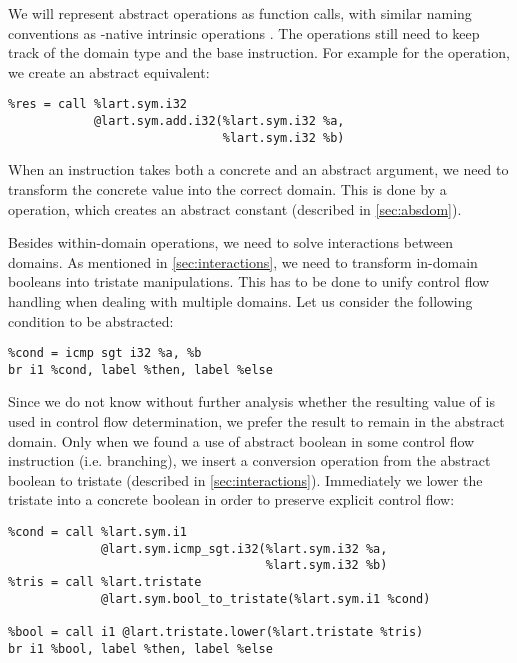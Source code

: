 We will represent abstract operations as function calls, with similar naming
conventions as \LLVM-native intrinsic operations \cite{LLVM:langref}. The
operations still need to keep track of the domain type and the base \LLVM instruction.
For example for the  operation, we create an abstract equivalent:
\begin{verbatim}
%res = call %lart.sym.i32
            @lart.sym.add.i32(%lart.sym.i32 %a,
                              %lart.sym.i32 %b)
\end{verbatim}

When an instruction takes both a concrete and an abstract argument, we need to
transform the concrete value into the correct domain. This is done by a 
operation, which creates an abstract constant (described in
\autoref{sec:absdom}).

Besides within-domain operations, we need to solve interactions between domains.
As mentioned in \autoref{sec:interactions}, we need to transform in-domain
booleans into tristate manipulations. This has to be done to unify control flow
handling when dealing with multiple domains. Let us consider the following
condition to be abstracted:
\begin{verbatim}
%cond = icmp sgt i32 %a, %b
br i1 %cond, label %then, label %else
\end{verbatim}
Since we do not know without further analysis whether the resulting value of
 is used in control flow determination, we prefer the result to
remain in the abstract domain. Only when we found a use of abstract boolean in
some control flow instruction (i.e. branching), we insert a conversion operation
from the abstract boolean to tristate (described in \autoref{sec:interactions}).
Immediately we lower the tristate into a concrete boolean in order to preserve
explicit control flow:
\begin{verbatim}
%cond = call %lart.sym.i1
             @lart.sym.icmp_sgt.i32(%lart.sym.i32 %a,
                                    %lart.sym.i32 %b)
%tris = call %lart.tristate
             @lart.sym.bool_to_tristate(%lart.sym.i1 %cond)

%bool = call i1 @lart.tristate.lower(%lart.tristate %tris)
br i1 %bool, label %then, label %else
\end{verbatim}


